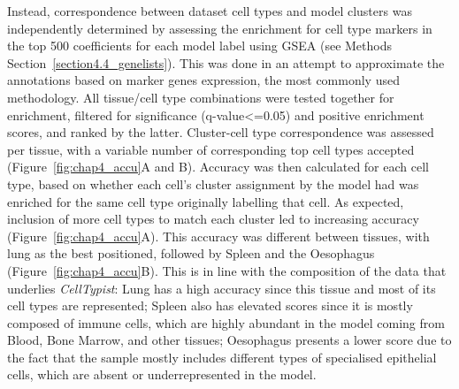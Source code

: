 Instead, correspondence between dataset cell types and model clusters was independently determined by assessing the enrichment for cell type markers in the top 500 coefficients for each model label using GSEA (see Methods Section~\ref{section4.4_genelists}). This was done in an attempt to approximate the annotations based on marker genes expression, the most commonly used methodology. All tissue/cell type combinations were tested together for enrichment, filtered for significance (q-value<=0.05) and positive enrichment scores, and ranked by the latter. Cluster-cell type correspondence was assessed per tissue, with a variable number of corresponding top cell types accepted (Figure~\ref{fig:chap4_accu}A and B). Accuracy was then calculated for each cell type, based on whether each cell's cluster assignment by the model had was enriched for the same cell type originally labelling that cell. As expected, inclusion of more cell types to match each cluster led to increasing accuracy (Figure~\ref{fig:chap4_accu}A). This accuracy was different between tissues, with lung as the best positioned, followed by Spleen and the Oesophagus (Figure~\ref{fig:chap4_accu}B). This is in line with the composition of the data that underlies \textit{CellTypist}: Lung has a high accuracy since this tissue and most of its cell types are represented; Spleen also has elevated scores since it is mostly composed of immune cells, which are highly abundant in the model coming from Blood, Bone Marrow, and other tissues; Oesophagus presents a lower score due to the fact that the sample mostly includes different types of specialised epithelial cells, which are absent or underrepresented in the model.

